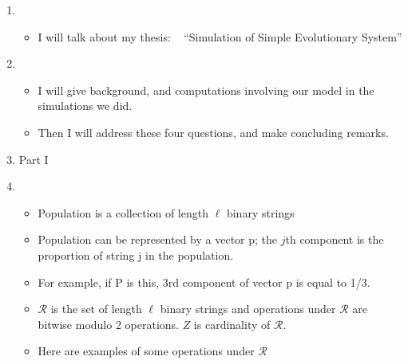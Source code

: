 \documentclass{article}
\begin{document}
\setcounter{page}{1}    
\newlength{\mywidth}
\setlength{\mywidth}{0.9\linewidth}
\newlength{\myheight}
\setlength{\myheight}{0.5in}
    
\begin{enumerate}
\item
  \begin{itemize}
  \item I will talk about my thesis: \hfill\mbox{ }\linebreak
      ``Simulation of Simple Evolutionary System'' 
  \end{itemize}  
    
\item
  \begin{itemize}
  \item      
      I will give background, and computations involving our model in the simulations we did. 
  \item
      Then I will address these four questions, and make
      concluding remarks.    
  \end{itemize}
  
\item Part I
  
\item
  \begin{itemize}
  \item Population is a collection of length $\ell$ binary strings 
  \item Population can be represented by a vector p; the $j$th component
      is the proportion of string j in the population.
  \item For example, if P is this, 3rd component of vector p is equal to 1/3.
    \item $\mathcal{R}$ is the set of length $\ell$ binary strings and operations under $\mathcal{R}$ are bitwise modulo 2 operations. $Z$ is cardinality of $\mathcal{R}$.
    \item Here are examples of some operations under $\mathcal{R}$
  \end{itemize}
    

\end{enumerate}
\end{document}

